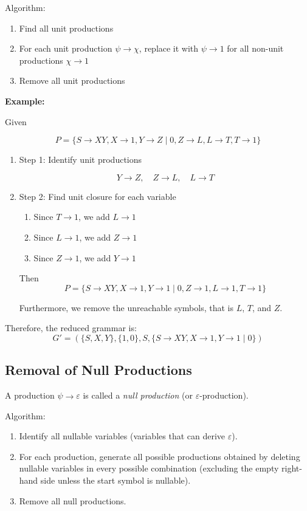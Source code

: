 \documentclass[12pt,a4paper,openany]{article}
\begin{document}
Algorithm:
\begin{enumerate}
    \item Find all unit productions
    \item For each unit production $\psi \to \chi$, replace it with $\psi \to 1$ for all non-unit productions $\chi \to 1$
    \item Remove all unit productions
\end{enumerate}

\textbf{Example:}

Given

\[P = \{S \to XY, X \to 1, Y \to Z \mid 0, Z \to L, L \to T, T \to 1\}\]

\begin{enumerate}

\item Step 1: Identify unit productions

\[Y \to Z, \quad Z \to L, \quad L \to T\]

\item Step 2: Find unit closure for each variable

\begin{enumerate}
    \item Since $T \to 1$, we add $L \to 1$
    \item Since $L \to 1$, we add $Z \to 1$
    \item Since $Z \to 1$, we add $Y \to 1$
\end{enumerate}

Then \[P = \{S \to XY, X \to 1, Y \to 1 \mid 0, Z \to 1, L \to 1, T \to 1\}\]

Furthermore, we remove the unreachable symbols, that is $L$, $T$, and $Z$. 

\end{enumerate}

Therefore, the reduced grammar is: \[\boxed{G' = (\{S, X, Y\}, \{1, 0\}, S, \{S \to XY, X \to 1, Y \to 1 \mid 0\})}\]

\subsection{Removal of Null Productions}

A production $\psi \to \varepsilon$ is called a \emph{null production} (or $\varepsilon$-production).

Algorithm:

\begin{enumerate}
    \item Identify all nullable variables (variables that can derive $\varepsilon$).
    \item For each production, generate all possible productions obtained by deleting
          nullable variables in every possible combination (excluding the empty right-hand
          side unless the start symbol is nullable).
    \item Remove all null productions.
\end{enumerate}
\end{document}

